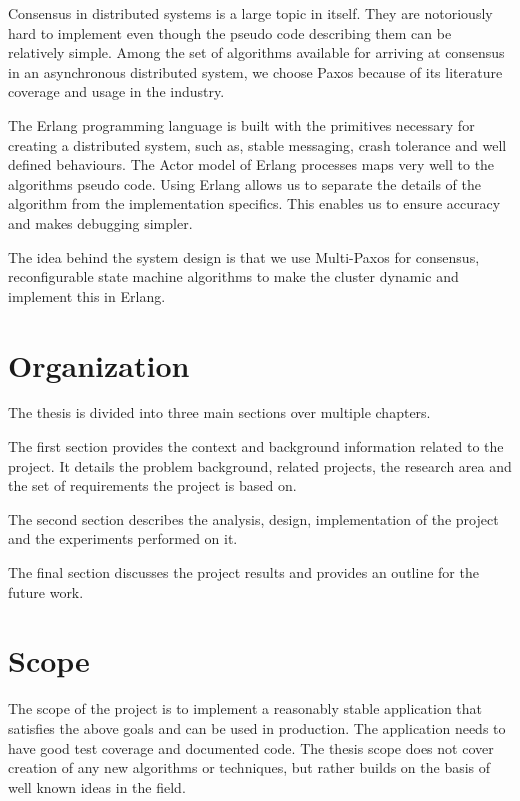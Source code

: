 Consensus in distributed systems is a large topic in itself. They are
notoriously hard to implement even though the pseudo code describing them can be
relatively simple. Among the set of algorithms available for arriving at
consensus in an asynchronous distributed system, we choose Paxos because of its
literature coverage and usage in the industry.

The Erlang programming language is built with the primitives necessary for
creating a distributed system, such as, stable messaging, crash tolerance and
well defined behaviours. The Actor model of Erlang processes maps very well to 
the algorithms pseudo code. Using Erlang allows us to separate the details of
the algorithm from the implementation specifics. This enables us to ensure
accuracy and makes debugging simpler.

The idea behind the system design is that we use Multi-Paxos for consensus,
reconfigurable state machine algorithms to make the cluster dynamic and
implement this in Erlang.

\section{Organization}
The thesis is divided into three main sections over multiple chapters.

The first section provides the context and background information related to the
project. It details the problem background, related projects, the research
area and the set of requirements the project is based on.

The second section describes the analysis, design, implementation of the project
and the experiments performed on it.

The final section discusses the project results and provides an outline for
the future work.

\section{Scope}

The scope of the project is to implement a reasonably stable application that
satisfies the above goals and can be used in production. The application needs
to have good test coverage and documented code. The thesis scope does not cover
creation of any new algorithms or techniques, but rather builds on the basis of
well known ideas in the field.


